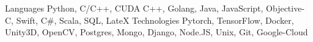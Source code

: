 
\begin{cvskills}
  \cvskill
    {Languages} %
    {Python, C/C++, CUDA C++, Golang, Java, JavaScript, Objective-C, Swift, C\#, Scala, SQL, LateX} %
  \cvskill
    {Technologies} %
    {Pytorch, TensorFlow, Docker, Unity3D, OpenCV, Postgres, Mongo, Django, Node.JS, Unix, Git, Google-Cloud} %
\end{cvskills}

